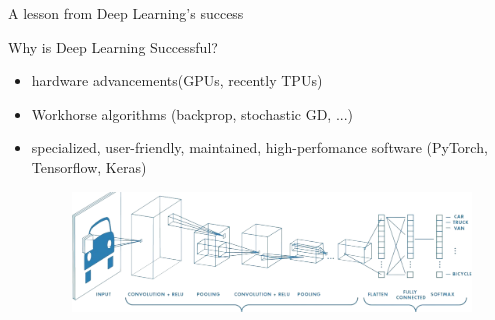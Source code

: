 \begin{frame}{A lesson from Deep Learning's success}
	\begin{Large}
		Why is Deep Learning \alert{Successful}? 
	\end{Large}

	\begin{itemize}
		\item hardware advancements(GPUs, recently TPUs)
		\item Workhorse algorithms (backprop, stochastic GD, ...)
		\item specialized, user-friendly, maintained, high-perfomance software (PyTorch, Tensorflow, Keras)
		
		\begin{figure}[h]
			\includegraphics[width=\linewidth]{backprop}
		\end{figure}
	\end{itemize}	
\end{frame}

